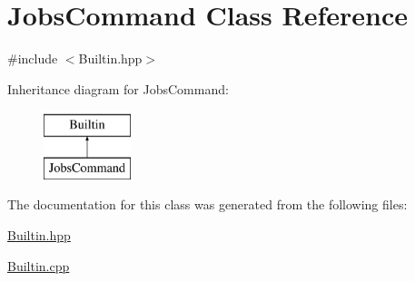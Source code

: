 \hypertarget{classJobsCommand}{
\section{JobsCommand Class Reference}
\label{classJobsCommand}
}


{\ttfamily \#include $<$Builtin.hpp$>$}

Inheritance diagram for JobsCommand:\begin{figure}[H]
\begin{center}
\leavevmode
\includegraphics[height=2.000000cm]{classJobsCommand}
\end{center}
\end{figure}


The documentation for this class was generated from the following files:\begin{DoxyCompactItemize}
\item 
\hyperlink{Builtin_8hpp}{Builtin.hpp}\item 
\hyperlink{Builtin_8cpp}{Builtin.cpp}\end{DoxyCompactItemize}
